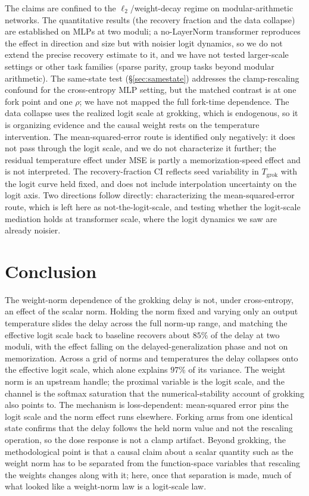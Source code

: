 The claims are confined to the $\ell_2$/weight-decay regime on modular-arithmetic networks. The
quantitative results (the recovery fraction and the data collapse) are established on MLPs at two moduli;
a no-LayerNorm transformer reproduces the effect in direction and size but with noisier logit dynamics, so
we do not extend the precise recovery estimate to it, and we have not tested larger-scale settings or other
task families (sparse parity, group tasks beyond modular arithmetic). The same-state test (\S\ref{sec:samestate})
addresses the clamp-rescaling confound for the cross-entropy MLP setting, but the matched contrast is at one
fork point and one $\rho$; we have not mapped the full fork-time dependence. The data collapse uses the
realized logit scale at grokking, which is endogenous, so it is organizing evidence and the causal weight
rests on the temperature intervention. The mean-squared-error route is identified only negatively: it does
not pass through the logit scale, and we do not characterize it further; the residual temperature effect
under MSE is partly a memorization-speed effect and is not interpreted. The recovery-fraction CI reflects
seed variability in $T_{\mathrm{grok}}$ with the logit curve held fixed, and does not include interpolation
uncertainty on the logit axis. Two directions follow directly: characterizing the mean-squared-error route,
which is left here as not-the-logit-scale, and testing whether the logit-scale mediation holds at
transformer scale, where the logit dynamics we saw are already noisier.

\section{Conclusion}

The weight-norm dependence of the grokking delay is not, under cross-entropy, an effect of the scalar norm.
Holding the norm fixed and varying only an output temperature slides the delay across the full norm-up
range, and matching the effective logit scale back to baseline recovers about $85\%$ of the delay at two
moduli, with the effect falling on the delayed-generalization phase and not on memorization. Across a
grid of norms and temperatures the delay collapses onto the effective logit scale, which alone explains
$97\%$ of its variance. The weight norm is an upstream handle; the proximal variable is the logit scale,
and the channel is the softmax saturation that the numerical-stability account of grokking also points to.
The mechanism is loss-dependent: mean-squared error pins the logit scale and the norm effect runs
elsewhere. Forking arms from one identical state confirms that the delay follows the held norm value and
not the rescaling operation, so the dose response is not a clamp artifact. Beyond grokking, the
methodological point is that a causal claim about a scalar quantity such as the weight norm has to be
separated from the function-space variables that rescaling the weights changes along with it; here, once
that separation is made, much of what looked like a weight-norm law is a logit-scale law.


